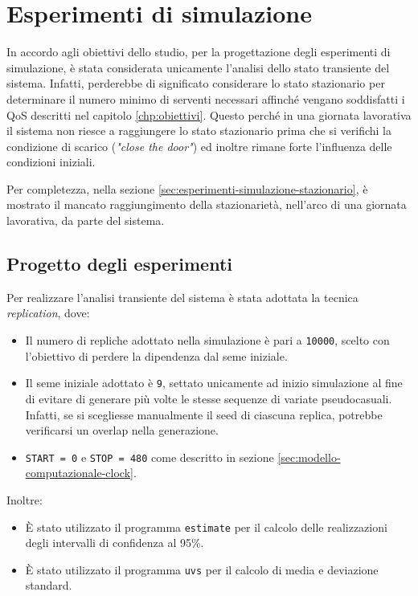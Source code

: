 \chapter{Esperimenti di simulazione}\label{chp:esperimenti-simulazione}
In accordo agli obiettivi dello studio, per la progettazione degli esperimenti di simulazione, è stata considerata unicamente l'analisi dello stato transiente del sistema. Infatti, perderebbe di significato considerare lo stato stazionario per determinare il numero minimo di serventi necessari affinché vengano soddisfatti i QoS descritti nel capitolo \ref{chp:obiettivi}. Questo perché in una giornata lavorativa il sistema non riesce a raggiungere lo stato stazionario prima che si verifichi la condizione di scarico (\textit{"close the door"}) ed inoltre rimane forte l'influenza delle condizioni iniziali. 

Per completezza, nella sezione \ref{sec:esperimenti-simulazione-stazionario}, è mostrato il mancato raggiungimento della stazionarietà, nell'arco di una giornata lavorativa, da parte del sistema. 

\section{Progetto degli esperimenti}\label{sec:esperimenti-simulazione-1}
Per realizzare l'analisi transiente del sistema è stata adottata la tecnica \textit{replication}, dove:
\begin{itemize}
\item Il numero di repliche adottato nella simulazione è pari a \texttt{10000}, scelto con l'obiettivo di perdere la dipendenza dal seme iniziale.
\item Il seme iniziale adottato è \texttt{9}, settato unicamente ad inizio simulazione al fine di evitare di generare più volte le stesse sequenze di variate pseudocasuali. Infatti, se si scegliesse manualmente il seed di ciascuna replica, potrebbe verificarsi un overlap nella generazione.
\item \texttt{START = 0} e \texttt{STOP = 480} come descritto in sezione \ref{sec:modello-computazionale-clock}.
\end{itemize}

Inoltre:
\begin{itemize}
\item È stato utilizzato il programma \texttt{estimate} per il calcolo delle realizzazioni degli intervalli di confidenza al 95\%.
\item È stato utilizzato il programma \texttt{uvs} per il calcolo di media e deviazione standard.
\end{itemize}

